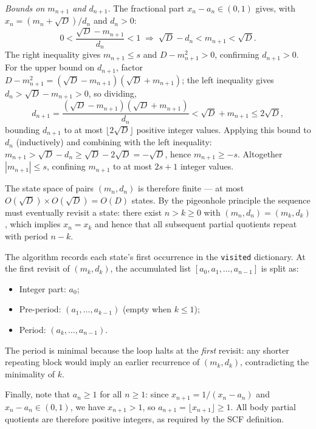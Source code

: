 \emph{Bounds on $m_{n+1}$ and $d_{n+1}$.}
The fractional part $x_n - a_n \in (0,1)$ gives, with
$x_n = (m_n + \sqrt{D})/d_n$ and $d_n > 0$:
\[
  0 < \frac{\sqrt{D} - m_{n+1}}{d_n} < 1
  \;\Longrightarrow\;
  \sqrt{D} - d_n < m_{n+1} < \sqrt{D}.
\]
The right inequality gives $m_{n+1} \leq s$ and $D - m_{n+1}^2 > 0$,
confirming $d_{n+1} > 0$.  For the upper bound on $d_{n+1}$, factor
$D - m_{n+1}^2 = (\sqrt{D} - m_{n+1})(\sqrt{D} + m_{n+1})$; the left
inequality gives $d_n > \sqrt{D} - m_{n+1} > 0$, so dividing,
\[
  d_{n+1}
  = \frac{(\sqrt{D} - m_{n+1})(\sqrt{D} + m_{n+1})}{d_n}
  < \sqrt{D} + m_{n+1}
  \leq 2\sqrt{D},
\]
bounding $d_{n+1}$ to at most $\lfloor 2\sqrt{D} \rfloor$ positive integer
values.  Applying this bound to $d_n$ (inductively) and combining with the
left inequality: $m_{n+1} > \sqrt{D} - d_n \geq \sqrt{D} - 2\sqrt{D} =
-\sqrt{D}$, hence $m_{n+1} \geq -s$.  Altogether $|m_{n+1}| \leq s$,
confining $m_{n+1}$ to at most $2s + 1$ integer values.

The state space of pairs $(m_n, d_n)$ is therefore finite — at most
$O(\sqrt{D}) \times O(\sqrt{D}) = O(D)$ states.  By the pigeonhole principle
the sequence must eventually revisit a state: there exist $n > k \geq 0$
with $(m_n, d_n) = (m_k, d_k)$, which implies $x_n = x_k$ and hence that
all subsequent partial quotients repeat with period $n - k$.

The algorithm records each state's first occurrence in the \texttt{visited}
dictionary.  At the first revisit of $(m_k, d_k)$, the accumulated list
$[a_0, a_1, \ldots, a_{n-1}]$ is split as:
\begin{itemize}
  \item Integer part: $a_0$;
  \item Pre-period: $(a_1, \ldots, a_{k-1})$ (empty when $k \leq 1$);
  \item Period: $(a_k, \ldots, a_{n-1})$.
\end{itemize}
The period is minimal because the loop halts at the \emph{first} revisit:
any shorter repeating block would imply an earlier recurrence of
$(m_k, d_k)$, contradicting the minimality of $k$.

Finally, note that $a_n \geq 1$ for all $n \geq 1$: since
$x_{n+1} = 1/(x_n - a_n)$ and $x_n - a_n \in (0,1)$, we have $x_{n+1} > 1$,
so $a_{n+1} = \lfloor x_{n+1}\rfloor \geq 1$.  All body partial quotients
are therefore positive integers, as required by the SCF definition.

